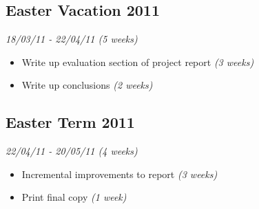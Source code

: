\documentclass[10pt,a4paper]{article}
\begin{document}
  \subsection{Easter Vacation 2011}
    \emph{18/03/11 - 22/04/11 (5 weeks)}
    \begin{itemize}
      \item Write up evaluation section of project report \emph{(3 weeks)}
      \item Write up conclusions \emph{(2 weeks)}
    \end{itemize}
  \subsection{Easter Term 2011}
    \emph{22/04/11 - 20/05/11 (4 weeks)}
    \begin{itemize}
      \item Incremental improvements to report \emph{(3 weeks)}
      \item Print final copy \emph{(1 week)}
    \end{itemize}
  
\end{document}
